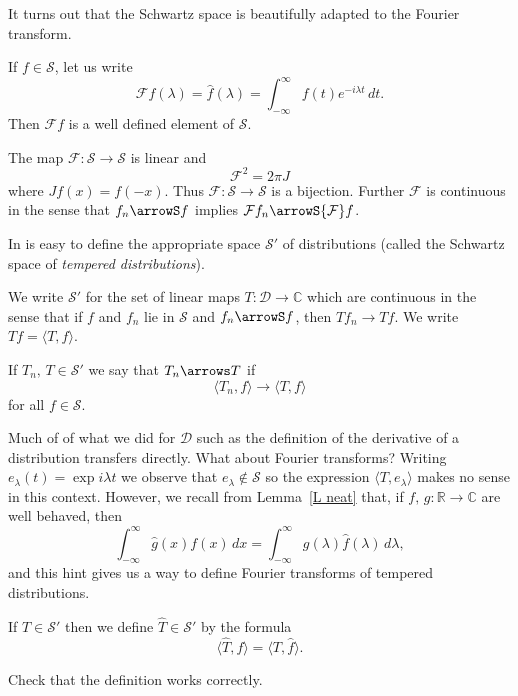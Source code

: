It turns out that the Schwartz space is beautifully adapted
to the Fourier transform.
\begin{theorem}\label{good S}
If $f\in{\mathcal S}$, let us write
\[{\mathcal F}f(\lambda)=\hat{f}(\lambda)
=\int_{-\infty}^{\infty}f(t)e^{-i\lambda t}\,dt.\]
Then ${\mathcal F}f$ is a well defined element of
${\mathcal S}$.

The map ${\mathcal F}:{\mathcal S}\rightarrow{\mathcal S}$
is linear and
\[{\mathcal F}^{2}=2\pi J\]
where $Jf(x)=f(-x)$. Thus
${\mathcal F}:{\mathcal S}\rightarrow{\mathcal S}$
is a bijection. Further ${\mathcal F}$ is continuous
in the sense that $f_{n}\arrowS f$ implies
${\mathcal F}f_{n}\arrowS{\mathcal F}f$.
\end{theorem}

In is easy to define the appropriate space ${\mathcal S}'$
of distributions (called the Schwartz space of \emph{tempered distributions}).
\begin{definition}
We write ${\mathcal S}'$
for the set of linear maps $T:{\mathcal D}\rightarrow{\mathbb C}$
which are continuous in the sense that
if $f$ and $f_{n}$ lie in
${\mathcal S}$ and $f_{n}\arrowS f$,
then $Tf_{n}\rightarrow Tf$. We write
$Tf=\langle T,f\rangle$.

If $T_{n},\,T\in{\mathcal S}'$
we say that $T_{n}\arrows T$ if
\[\langle T_{n},f\rangle\rightarrow \langle T,f\rangle\]
for all $f\in{\mathcal S}$.
\end{definition}

Much of of what we did for ${\mathcal D}$ such as the
definition of the derivative of a distribution transfers directly.
What about Fourier transforms?
Writing $e_{\lambda}(t)=\exp i\lambda t$ we observe that
$e_{\lambda}\notin{\mathcal S}$ so the expression
$ \langle T,e_{\lambda}\rangle$ makes no sense in this context.
However, we recall from Lemma~\ref{L neat}
that, if $f,\,g:{\mathbb R}\rightarrow{\mathbb C}$
are well behaved, then
\[\int_{-\infty}^{\infty}\hat{g}(x)f(x)\,dx
=\int_{-\infty}^{\infty}g(\lambda)\hat{f}(\lambda)\,d\lambda,\]
and this hint gives us a way to define Fourier transforms
of tempered distributions.
\begin{definition} If $T\in{\mathcal S}'$ then we
define $\hat{T}\in{\mathcal S}'$ by the formula
\[\langle \hat{T},f\rangle=\langle T,\hat{f}\rangle.\]
\end{definition}
\begin{exercise} Check that the definition works correctly.
\end{exercise}

